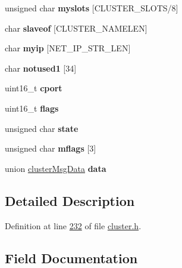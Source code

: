 \begin{DoxyCompactItemize}
unsigned char {\bfseries myslots} \mbox{[}C\+L\+U\+S\+T\+E\+R\+\_\+\+S\+L\+O\+TS/8\mbox{]}
\item 
\mbox{\label{structclusterMsg_a5ca36f3f6316a0dfbf9ad4a1bbfdeb4a}} 
char {\bfseries slaveof} \mbox{[}C\+L\+U\+S\+T\+E\+R\+\_\+\+N\+A\+M\+E\+L\+EN\mbox{]}
\item 
\mbox{\label{structclusterMsg_a4cecbddb92257abd32c3f3bfdb716614}} 
char {\bfseries myip} \mbox{[}N\+E\+T\+\_\+\+I\+P\+\_\+\+S\+T\+R\+\_\+\+L\+EN\mbox{]}
\item 
\mbox{\label{structclusterMsg_a8f272476209e87783b2585bda0627912}} 
char {\bfseries notused1} \mbox{[}34\mbox{]}
\item 
\mbox{\label{structclusterMsg_a330ad2b74be19fa8130b5e5920d8c9fc}} 
uint16\+\_\+t {\bfseries cport}
\item 
\mbox{\label{structclusterMsg_a2f5c02fb1d61410470cbfa32942fb745}} 
uint16\+\_\+t {\bfseries flags}
\item 
\mbox{\label{structclusterMsg_a5cdfa214f48e21eb3ab2447acf18bc84}} 
unsigned char {\bfseries state}
\item 
\mbox{\label{structclusterMsg_a1e6c3ad5211fb97e8ce03d35cc2ff747}} 
unsigned char {\bfseries mflags} \mbox{[}3\mbox{]}
\item 
\mbox{\label{structclusterMsg_ae4a26a803883a1351225a9e12ede60a4}} 
union \hyperlink{unionclusterMsgData}{cluster\+Msg\+Data} {\bfseries data}
\end{DoxyCompactItemize}


\subsection{Detailed Description}


Definition at line \hyperlink{cluster_8h_source_l00232}{232} of file \hyperlink{cluster_8h_source}{cluster.\+h}.



\subsection{Field Documentation}
\mbox{\label{structclusterMsg_a45369d8251925dbda938652bf1f4438c}} 
